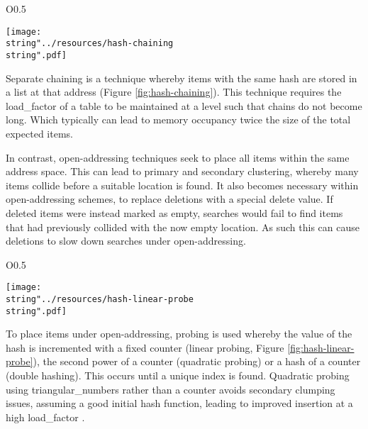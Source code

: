 \begin{wrapfigure}{O}{0.5\columnwidth}
  \begin{centering}
    \texttt{[image: \\string"../resources/hash-chaining\\string".pdf]}
  \par\end{centering}
  \protect\caption[A visual representation of a hash table that utilises separate chaining.]{\label{fig:hash-chaining}A visual representation of a hash table that utilises separate chaining.}
\end{wrapfigure}
      Separate chaining is a technique whereby items with the same hash are stored in a list at that address (Figure \ref{fig:hash-chaining}). This technique requires the \gls{load_factor} of a table to be maintained at a level such that chains do not become long. Which typically can lead to memory occupancy twice the size of the total expected items.
      
      In contrast, open-addressing techniques seek to place all items within the same address space. This can lead to primary and secondary clustering, whereby many items collide before a suitable location is found. It also becomes necessary within open-addressing schemes, to replace deletions with a special delete value. If deleted items were instead marked as empty, searches would fail to find items that had previously collided with the now empty location. As such this can cause deletions to slow down searches under open-addressing.
      
\begin{wrapfigure}{O}{0.5\columnwidth}
  \begin{centering}
    \texttt{[image: \\string"../resources/hash-linear-probe\\string".pdf]}
  \par\end{centering}
  \protect\caption[A visual representation of a hash table that utilises linear probing.]{\label{fig:hash-linear-probe}A visual representation of a hash table that utilises linear probing using the hash function $h(k,i)=((k+i)\:mod\:11)$.}
\end{wrapfigure}
      To place items under open-addressing, probing is used whereby the value of the hash is incremented with a fixed counter (linear probing, Figure \ref{fig:hash-linear-probe}), the second power of a counter (quadratic probing) or a hash of a counter (double hashing). This occurs until a unique index is found. Quadratic probing using \gls{triangular_numbers} rather than a counter avoids secondary clumping issues, assuming a good initial hash function, leading to improved insertion at a high \gls{load_factor} \cite{Knu98}.
      
